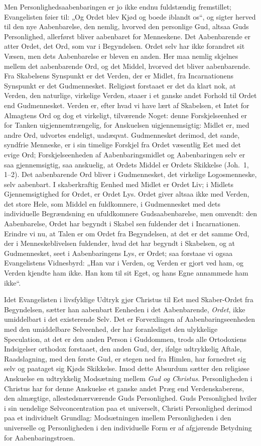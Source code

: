 \documentclass[12pt]{book}
\begin{document}
Men Personlighedsaabenbaringen er jo ikke endnu fuldstændig
fremstillet; Evangelisten føier til: „Og Ordet blev Kjød og boede
iblandt os“, og sigter herved til den nye Aabenbarelse, den nemlig,
hvorved den personlige Gud, altsaa Guds Personlighed, allerførst
bliver aabenbaret for Menneskene. Det Aabenbarende er atter Ordet,
det Ord, som var i Begyndelsen. Ordet selv har ikke forandret sit
Væsen, men dets Aabenbarelse er bleven en anden. Her maa nemlig
skjelnes mellem det aabenbarende Ord, og det Middel, hvorved det
bliver aabenbarende. Fra Skabelsens Synspunkt er det Verden, der er
Midlet, fra Incarnationens Synspunkt er det Gudmennesket. Religiøst
forstaaet er det da klart nok, at Verden, den naturlige, virkelige
Verden, staaer i et ganske andet Forhold til Ordet end Gudmennesket.
Verden er, efter hvad vi have lært af Skabelsen, et Intet for
Almagtens Ord og dog et virkeligt, tilværende Noget: denne
Forskjelseenhed er for Tanken uigjennemtrængelig, for Anskuelsen
uigjennemsigtig: Midlet er, med andre Ord, udvortes endeligt,
uadæqvat. Gudmennesket derimod, det sande, syndfrie Menneske, er i
sin timelige Forskjel fra Ordet væsentlig Eet med det evige Ord;
Forskjelseenheden af Aabenbaringsmidlet og Aabenbaringen selv er saa
gjennemsigtig, saa anskuelig, at Ordets Middel er Ordets Skikkelse
(Joh.\ 1, 1--2). Det aabenbarende Ord bliver i Gudmennesket, det
virkelige Logosmenneske, selv aabenbart. I skaberkraftig Eenhed med
Midlet er Ordet Liv; i Midlets Gjennemsigtighed for Ordet, er Ordet
Lys. Ordet giver altsaa ikke med Verden, det store Hele, som Middel
en fuldkomnere, i Gudmennesket med dets individuelle Begrændsning en
ufuldkomnere Gudsaabenbarelse, men omvendt: den Aabenbarelse, Ordet
har begyndt i Skabel\-
sen fuldender det i Incarnationen. Erindre vi nu, at Talen er om
Ordet fra Begyndelsen, at det er det samme Ord, der i
Menneskeblivelsen fuldender, hvad det har begyndt i Skabelsen, og at
Gudmennesket, seet i Aabenbaringens Lys, er Ordet; saa forstaae vi
ogsaa Evangelistens Vidnesbyrd: „Han var i Verden, og Verden er
gjort ved ham, og Verden kjendte ham ikke. Han kom til sit Eget, og
hans Egne annammede ham ikke“.

Idet Evangelisten i livsfyldige Udtryk gjør Christus til Eet med
Skaber-Ordet fra Begyndelsen, sætter han aabenbart Eenheden i det
Aabenbarende, \emph{Ordet}, ikke umiddelbart i det existerende Selv.
Det er Forvexlingen af Aabenbaringseenheden med den umiddelbare
Selveenhed, der har foranlediget den ulykkelige Speculation, at det
er den anden Person i Guddommen, trods alle Ortodoxiens Indsigelser
orthodox forstaaet, den anden Gud, der, ifølge udtrykkelig Aftale,
Raadslagning, med den første Gud, er stegen ned fra Himlen, har
fornedret sig selv og paataget sig Kjøds Skikkelse. Imod dette
Absurdum sætter den religiøse Anskuelse en udtrykkelig Modsætning
mellem \emph{Gud og Christus}. Personligheden i Christus har for
denne Anskuelse et ganske andet Præg end Verdenskaberens, den
almægtige, allestedsnærværende Guds Personlighed. Guds Personlighed
hviler i sin uendelige Selvconcentration paa et universelt, Christi
Personlighed derimod paa et individuelt Grundlag: Modsætningen
imellem Personligheden i den universelle og Personligheden i den
individuelle Form er af afgjørende Betydning for Aabenbaringstroen.
\end{document}
